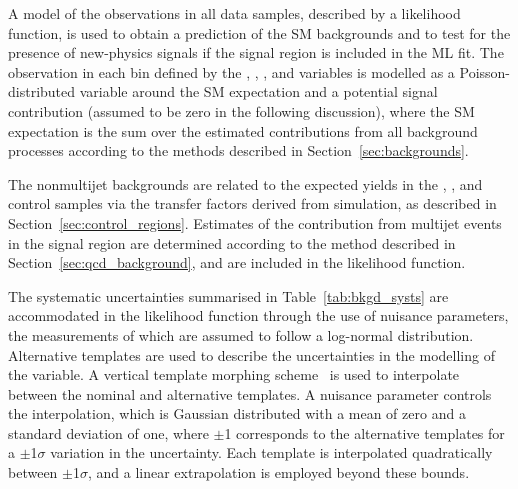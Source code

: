 A model of the observations in all data samples, described by a
likelihood function, is used to obtain a prediction of the SM
backgrounds and to test for the presence of new-physics signals if
the signal region is included in the ML fit. The
observation in each bin defined by the \njet, \nb, \scalht, and
\HTmiss variables is modelled as a Poisson-distributed variable around
the SM expectation and a potential signal contribution (assumed to be
zero in the following discussion), where the SM expectation is the sum
over the estimated contributions from all background processes
according to the methods described in Section~\ref{sec:backgrounds}.

The nonmultijet backgrounds
are related to the expected yields in the \mj, \mmj, and \gj control
samples via the transfer factors derived from simulation, as described
in Section~\ref{sec:control_regions}.
Estimates of the contribution from multijet events in the signal
region are determined according to the method described in
Section~\ref{sec:qcd_background}, and are included in the likelihood
function.


The systematic uncertainties summarised in Table~\ref{tab:bkgd_systs}
are accommodated in the likelihood function through the use of
nuisance parameters, the measurements of which are assumed to follow a
log-normal distribution. Alternative templates are used to describe
the uncertainties in the modelling of the \HTmiss variable. A vertical
template morphing scheme~\cite{Prosper:2011zz} is used to interpolate
between the nominal and alternative \HTmiss templates. A nuisance
parameter controls the interpolation, which is Gaussian distributed
with a mean of zero and a standard deviation of one, where $\pm$1
corresponds to the alternative templates for a $\pm$1$\sigma$
variation in the uncertainty. Each template is interpolated
quadratically between $\pm$1$\sigma$, and a linear extrapolation is
employed beyond these bounds.

